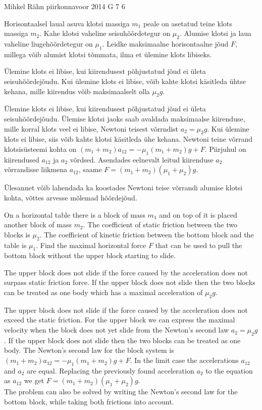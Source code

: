 {Mihkel Rähn} %
{piirkonnavoor} %
{2014} %
{G 7} %
{6} %
{
\ifStatement
Horisontaalsel laual asuva klotsi massiga $m_1$ peale on asetatud teine klots massiga $m_2$. Kahe klotsi vaheline seisuhõõrdetegur on $\mu_2$. Alumise klotsi ja laua vaheline liugehõõrdetegur on $\mu_1$. Leidke maksimaalne horisontaalne jõud $F$, millega võib alumist klotsi tõmmata, ilma et ülemine klots libiseks.
\fi


\ifHint
Ülemine klots ei libise, kui kiirendusest põhjustatud jõud ei ületa seisuhõõrdejõudu. Kui ülemine klots ei libise, võib kahte klotsi käsitleda ühtse kehana, mille kiirendus võib maksimaalselt olla $\mu_2g$.
\fi


\ifSolution
Ülemine klots ei libise, kui kiirendusest põhjustatud jõud ei ületa seisuhõõrdejõudu. Ülemise klotsi jaoks saab avaldada maksimaalse kiirenduse, mille korral klots veel ei libise, Newtoni teisest võrrndist $a_2=\mu_2g$. Kui ülemine klots ei libise, siis võib kahte klotsi käsitleda ühe kehana. Newtoni teine võrrand klotsisüsteemi kohta on $(m_1+m_2)a_{12} = -\mu_1 (m_1+m_2)g+F$. Piirjuhul on kiirendused $a_{12}$ ja $a_2$ võrdsed. Asendades eelnevalt leitud kiirenduse $a_2$ võrrandisse liikmena $a_{12}$, saame $F=(m_1+m_2)(\mu_1+\mu_2)g$.

Ülesannet võib lahendada ka koostades Newtoni teise võrrandi alumise klotsi kohta, võttes arvesse mõlemad hõõrdejõud. 
\fi


\ifEngStatement
On a horizontal table there is a block of mass $m_1$ and on top of it is placed another block of mass $m_2$. The coefficient of static friction between the two blocks is $\mu_2$. The coefficient of kinetic friction between the bottom block and the table is $\mu_1$. Find the maximal horizontal force $F$ that can be used to pull the bottom block without the upper block starting to slide.
\fi


\ifEngHint
The upper block does not slide if the force caused by the acceleration does not surpass static friction force. If the upper block does not slide then the two blocks can be treated as one body which has a maximal acceleration of $\mu_2g$.
\fi


\ifEngSolution
The upper block does not slide if the force caused by the acceleration does not exceed the static friction. For the upper block we can express the maximal velocity when the block does not yet slide from the Newton’s second law $a_2=\mu_2g$. If the upper block does not slide then the two blocks can be treated as one body. The Newton’s second law for the block system is $(m_1+m_2)a_{12} = -\mu_1 (m_1+m_2)g+F$. In the limit case the accelerations $a_{12}$ and $a_2$ are equal. Replacing the previously found acceleration $a_2$ to the equation as $a_{12}$ we get $F=(m_1+m_2)(\mu_1+\mu_2)g$.\\
The problem can also be solved by writing the Newton’s second law for the bottom block, while taking both frictions into account.
\fi
}